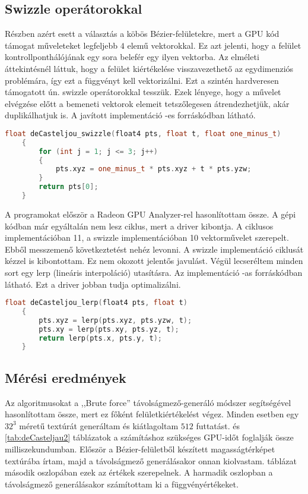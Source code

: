 \subsection{Swizzle operátorokkal}
Részben azért esett a választás a köbös Bézier-felületekre, mert a GPU kód támogat műveleteket legfeljebb $4$ elemű vektorokkal. Ez azt jelenti, hogy a felület kontrollponthálójának egy sora belefér egy ilyen vektorba. Az elméleti áttekintésnél láttuk, hogy a felület kiértékelése visszavezethető az egydimenziós problémára, így ezt a függvényt kell vektorizálni. Ezt a szintén hardveresen támogatott ún. swizzle operátorokkal tesszük. Ezek lényege, hogy a művelet elvégzése előtt a bemeneti vektorok elemeit tetszőlegesen átrendezhetjük, akár duplikálhatjuk is. A javított implementáció -es forráskódban látható.

\begin{lstlisting}[caption={de Casteljau swizzle operátorokkal}, language={C++}, label={lst:swizzle}]
	float deCasteljou_swizzle(float4 pts, float t, float one_minus_t)
	{
		for (int j = 1; j <= 3; j++)
		{
			pts.xyz = one_minus_t * pts.xyz + t * pts.yzw;
		}
		return pts[0];
	}
\end{lstlisting}

A programokat először a Radeon GPU Analyzer-rel hasonlítottam össze. A gépi kódban már egyáltalán nem lesz ciklus, mert a driver kibontja. A ciklusos implementációban 11, a swizzle implementációban 10 vektorművelet szerepelt. Ebből messzemenő következtetést nehéz levonni. A swizzle implementáció ciklusát kézzel is kibontottam. Ez nem okozott jelentős javulást. Végül lecseréltem minden sort egy lerp (lineáris interpoláció) utasításra. Az implementáció -as forráskódban látható. Ezt a driver jobban tudja optimalizálni. 

\lstset{}
\begin{lstlisting}[caption={de Casteljau lerp függvénnyel}, language={C++}, label={lst:lerp}]
	float deCasteljou_lerp(float4 pts, float t)
	{
		pts.xyz = lerp(pts.xyz, pts.yzw, t);
		pts.xy = lerp(pts.xy, pts.yz, t);
		return lerp(pts.x, pts.y, t);
	}
\end{lstlisting}


\subsection{Mérési eredmények}
Az algoritmusokat a ,,Brute force'' távolságmező-generáló módszer segítségével hasonlítottam össze, mert ez főként felületkiértékelést végez. Minden esetben egy $32^3$ méretű textúrát generáltam és kiátlagoltam $512$ futtatást.  és \ref{tab:deCasteljau2} táblázatok a számításhoz szükséges GPU-időt foglalják össze milliszekundumban. Először a Bézier-felületből készített magasságtérképet textúrába írtam, majd a távolságmező generálásakor onnan kiolvastam.  táblázat második oszlopában ezek az értékek szerepelnek. A harmadik oszlopban a távolságmező generálásakor számítottam ki a függvényértékeket.

